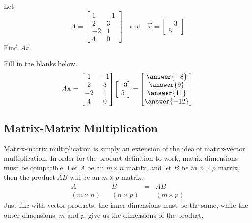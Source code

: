 \documentclass{ximera}
\begin{document}
\begin{example}\label{ex:matrixvectormultpractice}
Let $$A=\begin{bmatrix}1&-1\\2&3\\-2&1\\4&0\end{bmatrix}\quad\text{and}\quad\vec{x}=\begin{bmatrix}-3\\5\end{bmatrix}
$$
Find $A\vec{x}$.
\begin{explanation}
Fill in the blanks below.  
$$A\vec{x}=\begin{bmatrix}1&-1\\2&3\\-2&1\\4&0\end{bmatrix}\begin{bmatrix}-3\\5\end{bmatrix}=\begin{bmatrix}\answer{-8}\\\answer{9}\\\answer{11}\\\answer{-12}\end{bmatrix}
$$
\end{explanation}
\end{example}

\subsection*{Matrix-Matrix Multiplication}

Matrix-matrix multiplication is simply an extension of the idea of matrix-vector multiplication.  In order for the product definition to work, matrix dimensions must be compatible.  Let $A$ be an $m\times n$ matrix, and let $B$ be an $n\times p$ matrix, then the product $AB$ will be an $m\times p$ matrix.
$$\begin{array}{ccccc}
A& & B &=& AB\\
(m\times n) & &(n\times p) & &(m\times p)
\end{array}$$
Just like with vector products, the inner dimensions must be the same, while the outer dimensions, $m$ and $p$, give us the dimensions of the product.
\end{document}
